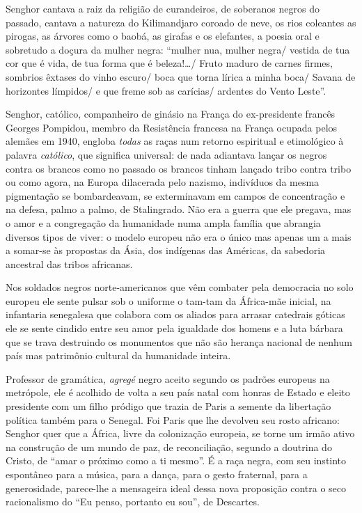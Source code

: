 \documentclass[
  letterpaper,
  DIV=11,
  numbers=noendperiod]{scrreprt}
\begin{document}
Senghor cantava a raiz da religião de curandeiros, de soberanos negros
do passado, cantava a natureza do Kilimandjaro coroado de neve, os rios
coleantes as pirogas, as árvores como o baobá, as girafas e os
elefantes, a poesia oral e sobretudo a doçura da mulher negra: ``mulher
nua, mulher negra/ vestida de tua cor que é vida, de tua forma que é
beleza!\ldots/ Fruto maduro de carnes firmes, sombrios êxtases do vinho
escuro/ boca que torna lírica a minha boca/ Savana de horizontes
límpidos/ e que freme sob as carícias/ ardentes do Vento Leste''.

Senghor, católico, companheiro de ginásio na França do ex-presidente
francês Georges Pompidou, membro da Resistência francesa na França
ocupada pelos alemães em 1940, engloba \emph{todas} as raças num retorno
espiritual e etimológico à palavra \emph{católico}, que significa
universal: de nada adiantava lançar os negros contra os brancos como no
passado os brancos tinham lançado tribo contra tribo ou como agora, na
Europa dilacerada pelo nazismo, indivíduos da mesma pigmentação se
bombardeavam, se exterminavam em campos de concentração e na defesa,
palmo a palmo, de Stalingrado. Não era a guerra que ele pregava, mas o
amor e a congregação da humanidade numa ampla família que abrangia
diversos tipos de viver: o modelo europeu não era o único mas apenas um
a mais a somar-se às propostas da Ásia, dos indígenas das Américas, da
sabedoria ancestral das tribos africanas.

Nos soldados negros norte-americanos que vêm combater pela democracia no
solo europeu ele sente pulsar sob o uniforme o tam-tam da África-mãe
inicial, na infantaria senegalesa que colabora com os aliados para
arrasar catedrais góticas ele se sente cindido entre seu amor pela
igualdade dos homens e a luta bárbara que se trava destruindo os
monumentos que não são herança nacional de nenhum país mas patrimônio
cultural da humanidade inteira.

Professor de gramática, \emph{agregé} negro aceito segundo os padrões
europeus na metrópole, ele é acolhido de volta a seu país natal com
honras de Estado e eleito presidente com um filho pródigo que trazia de
Paris a semente da libertação política também para o Senegal. Foi Paris
que lhe devolveu seu rosto africano: Senghor quer que a África, livre da
colonização europeia, se torne um irmão ativo na construção de um mundo
de paz, de reconciliação, segundo a doutrina do Cristo, de ``amar o
próximo como a ti mesmo''. É a raça negra, com seu instinto espontâneo
para a música, para a dança, para o gesto fraternal, para a
generosidade, parece-lhe a mensageira ideal dessa nova proposição contra
o seco racionalismo do ``Eu penso, portanto eu sou'', de Descartes.
\end{document}
